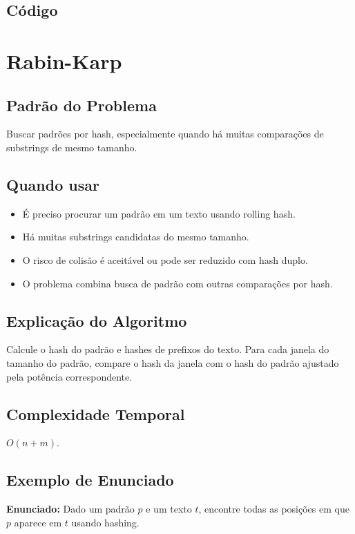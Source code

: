 \subsection{Código}

\section{Rabin-Karp}

\subsection{Padrão do Problema}
Buscar padrões por hash, especialmente quando há muitas comparações de substrings de mesmo tamanho.

\subsection{Quando usar}
\begin{itemize}[nosep]
  \item É preciso procurar um padrão em um texto usando rolling hash.
  \item Há muitas substrings candidatas do mesmo tamanho.
  \item O risco de colisão é aceitável ou pode ser reduzido com hash duplo.
  \item O problema combina busca de padrão com outras comparações por hash.
\end{itemize}

\subsection{Explicação do Algoritmo}
Calcule o hash do padrão e hashes de prefixos do texto. Para cada janela do tamanho do padrão, compare o hash da janela com o hash do padrão ajustado pela potência correspondente.

\subsection{Complexidade Temporal}
$O(n + m)$.

\subsection{Exemplo de Enunciado}
\begin{exemplodiabox}
\textbf{Enunciado:} Dado um padrão $p$ e um texto $t$, encontre todas as posições em que $p$ aparece em $t$ usando hashing.
\end{exemplodiabox}

